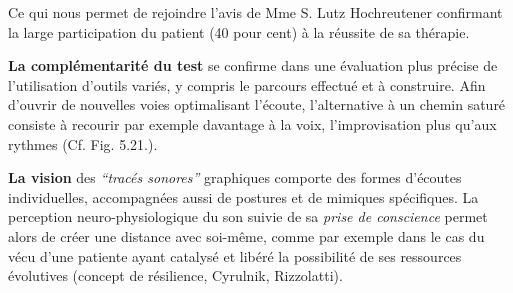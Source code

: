         
        Ce qui nous permet de rejoindre l'avis de Mme S. Lutz
 Hochreutener confirmant la large participation du patient (40 pour cent) à la réussite de sa thérapie.

 
  


 \textbf{La complémentarité du test} se confirme dans une évaluation plus
 précise de l'utilisation d'outils variés, y compris  le parcours effectué et à
 construire.
 Afin d'ouvrir de nouvelles
 voies optimalisant l'écoute, l'alternative à un chemin saturé
 consiste à recourir par exemple davantage  à la voix, l'improvisation
 plus qu'aux rythmes (Cf. Fig. 5.21.).

 
 \textbf{La vision}
des \textit{``tracés sonores''} graphiques comporte des formes
d'écoutes individuelles, accompagnées aussi de postures et de mimiques spécifiques.
La  perception  
neuro-physiologique du son suivie de sa 
 \textit{prise de conscience }
permet alors de créer une distance avec
soi-même, comme par exemple dans le cas 
du vécu  d'une patiente ayant catalysé et libéré 
la possibilité de ses ressources évolutives (concept de résilience, Cyrulnik, Rizzolatti)\autocite[27--63]{van_eersel_cerveau}.



